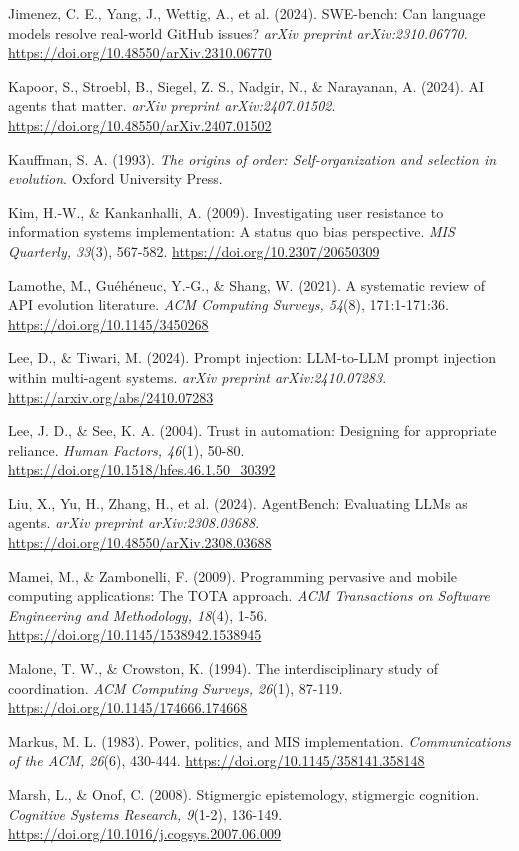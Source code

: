 \documentclass[12pt,a4paper]{article}
\begin{document}
Jimenez, C. E., Yang, J., Wettig, A., et al. (2024). SWE-bench: Can
language models resolve real-world GitHub issues? \emph{arXiv preprint
arXiv:2310.06770}. \url{https://doi.org/10.48550/arXiv.2310.06770}

Kapoor, S., Stroebl, B., Siegel, Z. S., Nadgir, N., \& Narayanan, A.
(2024). AI agents that matter. \emph{arXiv preprint arXiv:2407.01502}.
\url{https://doi.org/10.48550/arXiv.2407.01502}

Kauffman, S. A. (1993). \emph{The origins of order: Self-organization
and selection in evolution}. Oxford University Press.

Kim, H.-W., \& Kankanhalli, A. (2009). Investigating user resistance to
information systems implementation: A status quo bias perspective.
\emph{MIS Quarterly, 33}(3), 567-582.
\url{https://doi.org/10.2307/20650309}

Lamothe, M., Guéhéneuc, Y.-G., \& Shang, W. (2021). A systematic review
of API evolution literature. \emph{ACM Computing Surveys, 54}(8),
171:1-171:36. \url{https://doi.org/10.1145/3450268}

Lee, D., \& Tiwari, M. (2024). Prompt injection: LLM-to-LLM prompt
injection within multi-agent systems. \emph{arXiv preprint
arXiv:2410.07283}. \url{https://arxiv.org/abs/2410.07283}

Lee, J. D., \& See, K. A. (2004). Trust in automation: Designing for
appropriate reliance. \emph{Human Factors, 46}(1), 50-80.
\url{https://doi.org/10.1518/hfes.46.1.50_30392}

Liu, X., Yu, H., Zhang, H., et al. (2024). AgentBench: Evaluating LLMs
as agents. \emph{arXiv preprint arXiv:2308.03688}.
\url{https://doi.org/10.48550/arXiv.2308.03688}

Mamei, M., \& Zambonelli, F. (2009). Programming pervasive and mobile
computing applications: The TOTA approach. \emph{ACM Transactions on
Software Engineering and Methodology, 18}(4), 1-56.
\url{https://doi.org/10.1145/1538942.1538945}

Malone, T. W., \& Crowston, K. (1994). The interdisciplinary study of
coordination. \emph{ACM Computing Surveys, 26}(1), 87-119.
\url{https://doi.org/10.1145/174666.174668}

Markus, M. L. (1983). Power, politics, and MIS implementation.
\emph{Communications of the ACM, 26}(6), 430-444.
\url{https://doi.org/10.1145/358141.358148}

Marsh, L., \& Onof, C. (2008). Stigmergic epistemology, stigmergic
cognition. \emph{Cognitive Systems Research, 9}(1-2), 136-149.
\url{https://doi.org/10.1016/j.cogsys.2007.06.009}
\end{document}
